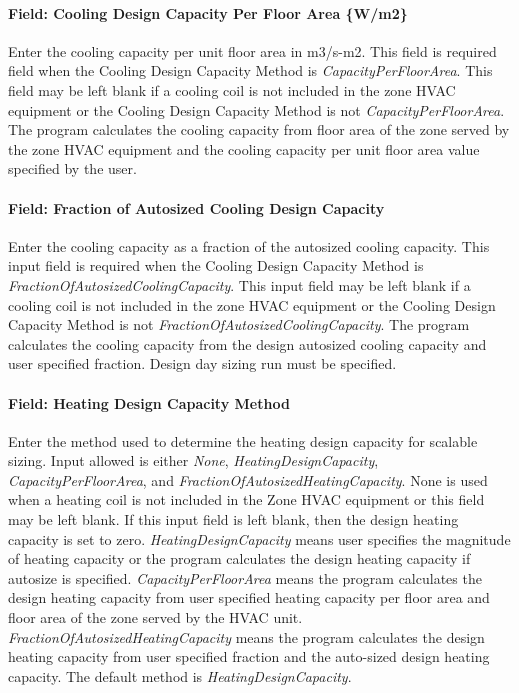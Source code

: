 \paragraph{Field: Cooling Design Capacity Per Floor Area \{W/m2\}}\label{field-cooling-design-capacity-per-floor-area-wm2}

Enter the cooling capacity per unit floor area in m3/s-m2. This field is required field when the Cooling Design Capacity Method is \emph{CapacityPerFloorArea}. This field may be left blank if a cooling coil is not included in the zone HVAC equipment or the Cooling Design Capacity Method is not \emph{CapacityPerFloorArea}. The program calculates the cooling capacity from floor area of the zone served by the zone HVAC equipment and the cooling capacity per unit floor area value specified by the user.

\paragraph{Field: Fraction of Autosized Cooling Design Capacity}\label{field-fraction-of-autosized-cooling-design-capacity}

Enter the cooling capacity as a fraction of the autosized cooling capacity. This input field is required when the Cooling Design Capacity Method is \emph{FractionOfAutosizedCoolingCapacity}. This input field may be left blank if a cooling coil is not included in the zone HVAC equipment or the Cooling Design Capacity Method is not \emph{FractionOfAutosizedCoolingCapacity}. The program calculates the cooling capacity from the design autosized cooling capacity and user specified fraction. Design day sizing run must be specified.

\paragraph{Field: Heating Design Capacity Method}\label{field-heating-design-capacity-method}

Enter the method used to determine the heating design capacity for scalable sizing. Input allowed is either \emph{None}, \emph{HeatingDesignCapacity}, \emph{CapacityPerFloorArea}, and \emph{FractionOfAutosizedHeatingCapacity}. None is used when a heating coil is not included in the Zone HVAC equipment or this field may be left blank. If this input field is left blank, then the design heating capacity is set to zero. \emph{HeatingDesignCapacity} means user specifies the magnitude of heating capacity or the program calculates the design heating capacity if autosize is specified. \emph{CapacityPerFloorArea} means the program calculates the design heating capacity from user specified heating capacity per floor area and floor area of the zone served by the HVAC unit. \emph{FractionOfAutosizedHeatingCapacity} means the program calculates the design heating capacity from user specified fraction and the auto-sized design heating capacity. The default method is \emph{HeatingDesignCapacity}.

